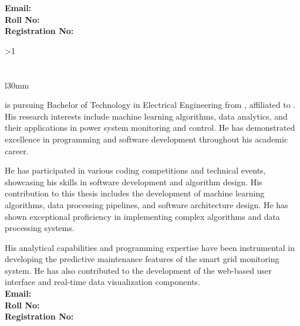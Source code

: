 \noindent
\textbf{Email:}\GetEmailOne \quad \\ \textbf{Roll No:} \GetRollOne \quad\\  \textbf{Registration No:} \GetRegOne

\vspace{5cm}

\ifnum\GetNumberOfStudents>1\relax
\section*{\GetStudentTwo}
\begin{wrapfigure}{l}{30mm}
	\vspace{-0.48cm}
\end{wrapfigure}
\justifying

\textbf{\GetStudentTwo} is pursuing Bachelor of Technology in Electrical Engineering from \GetCollege, affiliated to \GetUniversity. His research interests include machine learning algorithms, data analytics, and their applications in power system monitoring and control. He has demonstrated excellence in programming and software development throughout his academic career.

He has participated in various coding competitions and technical events, showcasing his skills in software development and algorithm design. His contribution to this thesis includes the development of machine learning algorithms, data processing pipelines, and software architecture design. He has shown exceptional proficiency in implementing complex algorithms and data processing systems.

His analytical capabilities and programming expertise have been instrumental in developing the predictive maintenance features of the smart grid monitoring system. He has also contributed to the development of the web-based user interface and real-time data visualization components.\\

\noindent
\textbf{Email:} \GetEmailTwo \quad \\ \textbf{Roll No:} \GetRollTwo \quad \\ \textbf{Registration No:} \GetRegTwo

\vspace{1cm}
\fi

